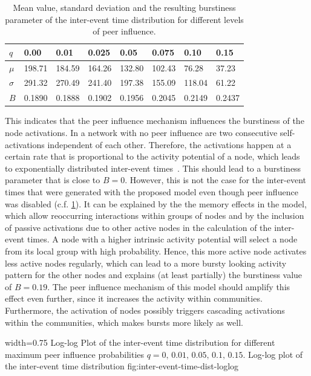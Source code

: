 \begin{table}[htbp]
\centering
\begin{tabular}{llllllll}
\( q \) & 0.00 & 0.01 & 0.025 & 0.05 & 0.075 & 0.10 & 0.15 \\ \hline
\( \mu \) & 198.71 & 184.59 & 164.26 & 132.80 & 102.43 & 76.28 & 37.23 \\ \hline
\( \sigma \) & 291.32 & 270.49 & 241.40 & 197.38 & 155.09 & 118.04 & 61.22 \\ \hline
\( B \) & 0.1890 & 0.1888 & 0.1902 & 0.1956 & 0.2045 & 0.2149 & 0.2437
\end{tabular}

\caption[Burstiness of inter-event time distributions]{Mean value, standard deviation and the resulting burstiness parameter of the inter-event time distribution for different levels of peer influence.}
\label{tbl:burstiness-parameter}
\end{table}


This indicates that the peer influence mechanism influences the burstiness of the node activations.
In a network with no peer influence are two consecutive self-activations independent of each other.
Therefore, the activations happen at a certain rate that is proportional to the activity potential of a node, which leads to exponentially distributed inter-event times~\cite{Moinet2016}.
This should lead to a burstiness parameter that is close to \( B = 0 \).
However, this is not the case for the inter-event times that were generated with the proposed model even though peer influence was disabled (c.f. \cref{tbl:burstiness-parameter}).
It can be explained by the the memory effects in the model, which allow reoccurring interactions within groups of nodes and by the inclusion of passive activations due to other active nodes in the calculation of the inter-event times.
A node with a higher intrinsic activity potential will select a node from its local group with high probability.
Hence, this more active node activates less active nodes regularly, which can lead to a more bursty looking activity pattern for the other nodes and explains (at least partially) the burstiness value of \( B = 0.19 \).
The peer influence mechanism of this model should amplify this effect even further, since it increases the activity within communities.
Furthermore, the activation of nodes possibly triggers cascading activations within the communities, which makes bursts more likely as well.


      {width=0.75\textwidth}
      {Log-log Plot of the inter-event time distribution for different maximum peer influence probabilities \( q = 0, \, 0.01, \, 0.05, \, 0.1, \, 0.15\).}
      {Log-log plot of the inter-event time distribution}
      {fig:inter-event-time-dist-loglog}


